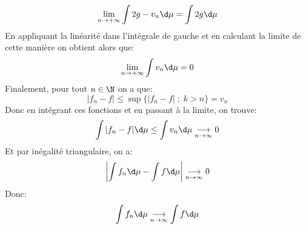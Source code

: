\documentclass{report}
\begin{document}
   \[
      \lim_{n \rightarrow +\infty} \int 2g - v_n \d\mu = \int 2g \d\mu
   \]
   En appliquant la linéarité dans l'intégrale de gauche et en calculant la limite de cette manière on obtient alors que:
   \[
      \lim_{n \rightarrow +\infty} \int v_n \d\mu = 0
   \]
   Finalement, pour tout \(n \in \N\) on a que:
   \[
      |f_n - f| \leq \sup\{|f_n - f| \; ; \; k > n\} = v_n
   \]
   Donc en intégrant ces fonctions et en passant à la limite, on trouve:
   \[
      \int |f_n - f| \d\mu \leq \int v_n \d\mu \underset{n \rightarrow \infty}{\longrightarrow} 0
   \]
   Et par inégalité triangulaire, on a: 
   \[
      \left|\int f_n \d\mu - \int f \d\mu  \right| \underset{n \rightarrow \infty}{\longrightarrow} 0
   \]
   Donc:
   \[
      \int f_n \d\mu \underset{n \rightarrow \infty}{\longrightarrow} \int f \d\mu
   \]
\end{document}
